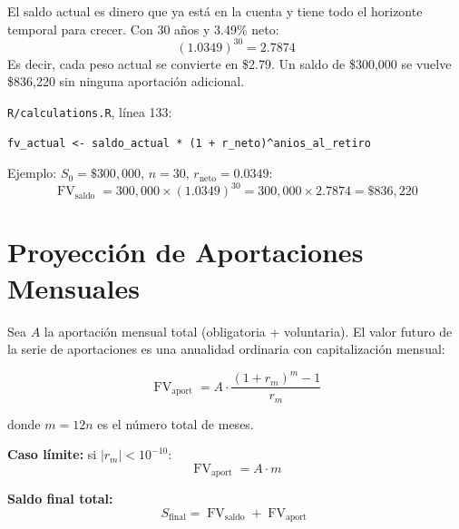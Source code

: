 \documentclass[11pt,a4paper]{report}
\theoremstyle{remark}
\DeclareMathOperator{\FV}{FV}
\begin{document}
\begin{tcolorbox}[colback=green!5!white, colframe=green!50!black, title=\textbf{Intuici\'on}]
El saldo actual es dinero que ya est\'a en la cuenta y tiene todo el horizonte temporal para crecer. Con 30 a\~nos y 3.49\% neto:
\[
(1.0349)^{30} = 2.7874
\]
Es decir, cada peso actual se convierte en \$2.79. Un saldo de \$300,000 se vuelve \$836,220 sin ninguna aportaci\'on adicional.
\end{tcolorbox}

\begin{tcolorbox}[colback=orange!5!white, colframe=orange!75!black, title=\textbf{Aplicaci\'on en C\'odigo}]
\texttt{R/calculations.R}, l\'inea 133:
\begin{lstlisting}
fv_actual <- saldo_actual * (1 + r_neto)^anios_al_retiro
\end{lstlisting}

Ejemplo: $S_0 = \$300{,}000$, $n = 30$, $r_{\text{neto}} = 0.0349$:
\[
\FV_{\text{saldo}} = 300{,}000 \times (1.0349)^{30} = 300{,}000 \times 2.7874 = \$836{,}220
\]
\end{tcolorbox}

\section{Proyecci\'on de Aportaciones Mensuales}

\begin{tcolorbox}[colback=blue!5!white, colframe=blue!75!black, title=\textbf{Definici\'on Formal}]
Sea $A$ la aportaci\'on mensual total (obligatoria + voluntaria). El valor futuro de la serie de aportaciones es una anualidad ordinaria con capitalizaci\'on mensual:

\begin{equation}
\FV_{\text{aport}} = A \cdot \frac{(1 + r_m)^{m} - 1}{r_m}
\label{eq:fv_aport}
\end{equation}

donde $m = 12n$ es el n\'umero total de meses.

\textbf{Caso l\'imite:} si $|r_m| < 10^{-10}$:
\begin{equation}
\FV_{\text{aport}} = A \cdot m
\end{equation}

\textbf{Saldo final total:}
\begin{equation}
S_{\text{final}} = \FV_{\text{saldo}} + \FV_{\text{aport}}
\label{eq:saldo_final}
\end{equation}
\end{tcolorbox}
\end{document}
